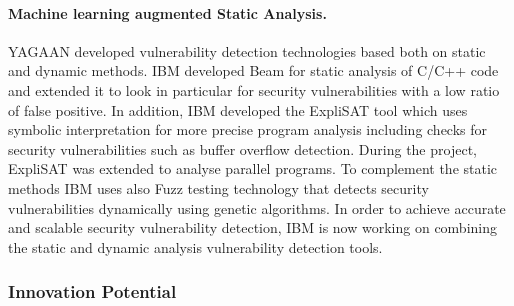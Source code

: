 \documentclass[a4paper,11pt]{article}
\begin{document}
\paragraph{\YAGshort{} Machine learning augmented Static Analysis.}

YAGAAN developed vulnerability detection technologies based both on static and dynamic methods. IBM developed Beam for static analysis of C/C++ code and extended it to look in particular for security vulnerabilities with a low ratio of false positive. In addition, IBM developed the ExpliSAT tool which uses symbolic interpretation for more precise program analysis including checks for security vulnerabilities such as buffer overflow detection. During the \rephrase{} project, ExpliSAT was extended to analyse parallel programs. To complement the static methods IBM uses also Fuzz testing technology that detects security vulnerabilities dynamically using genetic algorithms. In order to achieve accurate and scalable security vulnerability detection, IBM is now working on combining the static and dynamic analysis vulnerability detection tools.     



\subsubsection{Innovation Potential}
\label{sec:innovationpotential}
\label{innovationpotential}

\end{document}
